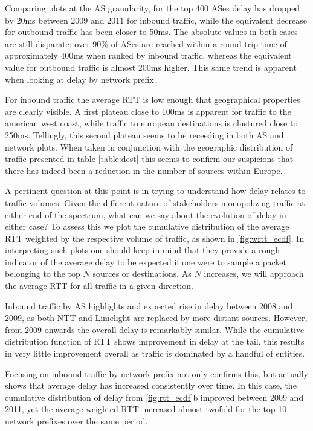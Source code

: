 Comparing plots at the AS granularity, for the top 400 ASes delay has dropped by 20ms between 2009 and 2011 for inbound traffic, while the equivalent decrease for outbound traffic has been closer to 50ms. The absolute values in both cases are still disparate: over 90\% of ASes are reached within a round trip time of approximately 400ms when ranked by inbound traffic, whereas the equivalent value for outbound traffic is almost 200ms higher. This same trend is apparent when looking at delay by network prefix.

For inbound traffic the average RTT is low enough that geographical properties are clearly visible. A first plateau close to 100ms is apparent for traffic to the american west coast, while traffic to european destinations is clustured close to 250ms. Tellingly, this second plateau seems to be receeding in both AS and network plots. When taken in conjunction with the geographic distribution of traffic presented in table \ref{table:dest} this seems to confirm our suspicions that there has indeed been a reduction in the number of sources within Europe. 

A pertinent question at this point is in trying to understand how delay relates to traffic volumes. Given the different nature of stakeholders monopolizing traffic at either end of the spectrum, what can we say about the evolution of delay in either case? To assess this we plot the cumulative distribution of the average RTT weighted by the respective volume of traffic, as shown in \ref{fig:wrtt_ecdf}. In interpreting such plots one should keep in mind that they provide a rough indicator of the average delay to be expected if one were to sample a packet belonging to the top $N$ sources or destinations. As $N$ increases, we will approach the average RTT for all traffic in a given direction.

Inbound traffic by AS highlights and expected rise in delay between 2008 and 2009, as both NTT and Limelight are replaced by more distant sources. However, from 2009 onwards the overall delay is remarkably similar. While the cumulative distribution function of RTT shows improvement in delay at the tail, this results in very little improvement overall as traffic is dominated by a handful of entities.

Focusing on inbound traffic by network prefix not only confirms this, but actually shows that average delay has increased consistently over time.
In this case, the cumulative distribution of delay from \ref{fig:rtt_ecdf}b improved between 2009 and 2011, yet the average weighted RTT increased almost twofold for the top 10 network prefixes over the same period.

